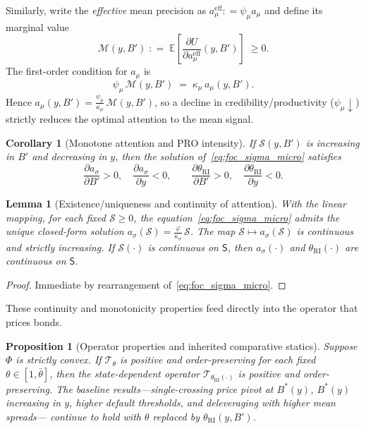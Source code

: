 \documentclass[12pt]{article}
\providecommand{\coloneqq}{\mathrel{\mathop:}=}
\theoremstyle{plain}
\newtheorem{proposition}{Proposition}
\newtheorem{lemma}{Lemma}
\newtheorem{corollary}{Corollary}
\newcommand{\E}{\mathbb{E}}
\begin{document}
\noindent Similarly, write the \emph{effective} mean precision as $a_\mu^{\mathrm{eff}}\coloneqq \psi_\mu a_\mu$ and define its marginal value
\begin{equation}
	\mathcal M(y,B') \;\coloneqq\; \E\!\left[\frac{\partial U}{\partial a_\mu^{\mathrm{eff}}}(y,B')\right] \;\ge 0.
\end{equation}
The first-order condition for $a_\mu$ is
\begin{equation}
	\psi_\mu\, \mathcal M(y,B') \;=\; \kappa_\mu\, a_\mu(y,B').
	\label{eq:foc_mu_micro}
\end{equation}
Hence $a_\mu(y,B')=\tfrac{\psi_\mu}{\kappa_\mu}\,\mathcal M(y,B')$, so a decline in credibility/productivity ($\psi_\mu\downarrow$) strictly reduces the optimal attention to the mean signal.

\begin{corollary}[Monotone attention and PRO intensity]
	\label{cor:monotone_attention}
	If $\mathcal S(y,B')$ is increasing in $B'$ and decreasing in $y$, then the
	solution of~\eqref{eq:foc_sigma_micro} satisfies
	\[
		\frac{\partial a_\sigma}{\partial B'}>0,\quad \frac{\partial a_\sigma}{\partial y}<0,
		\qquad \frac{\partial \theta_{\mathrm{RI}}}{\partial B'}>0,\quad \frac{\partial \theta_{\mathrm{RI}}}{\partial y}<0.
	\]
\end{corollary}

\begin{lemma}[Existence/uniqueness and continuity of attention]
	\label{lem:attention_solution}
	With the linear mapping, for each fixed $\mathcal S\ge0$, the equation~\eqref{eq:foc_sigma_micro}
	admits the unique closed-form solution $a_\sigma(\mathcal S)=\tfrac{\varphi}{\kappa_\sigma}\,\mathcal S$.
	The map $\mathcal S\mapsto a_\sigma(\mathcal S)$ is continuous and strictly increasing.
	If $\mathcal S(\cdot)$ is continuous on $\mathsf S$, then $a_\sigma(\cdot)$ and
	$\theta_{\mathrm{RI}}(\cdot)$ are continuous on $\mathsf S$.
\end{lemma}

\begin{proof}
	Immediate by rearrangement of~\eqref{eq:foc_sigma_micro}.
\end{proof}

\medskip
These continuity and monotonicity properties feed directly into the operator that
prices bonds.

\begin{proposition}[Operator properties and inherited comparative statics]
	\label{prop:RI_operator_micro}
	Suppose $\Phi$ is strictly convex. If $\mathcal T_\theta$ is positive and order-preserving for each
	fixed $\theta\in[1,\bar\theta]$, then the state-dependent operator
	$\mathcal T_{\theta_{\mathrm{RI}}(\cdot)}$ is positive and order-preserving. The
	baseline results—single-crossing price pivot at $B^*(y)$, $B^*(y)$ increasing
	in $y$, higher default thresholds, and deleveraging with higher mean spreads—
	continue to hold with $\theta$ replaced by $\theta_{\mathrm{RI}}(y,B')$.
\end{proposition}
\end{document}
